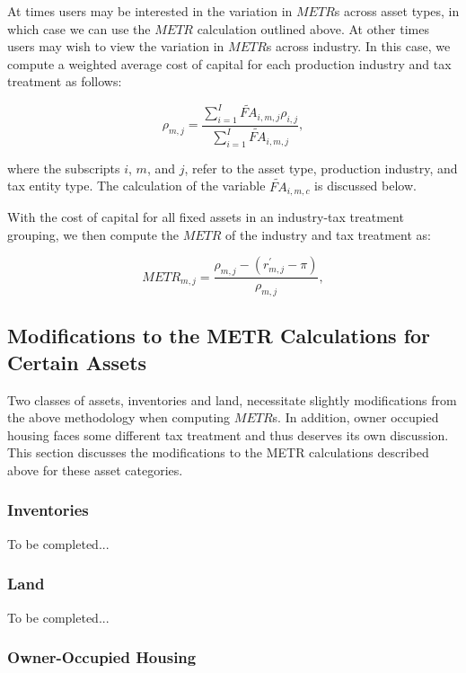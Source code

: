 \documentclass[article,11pt,letterpaper,fleqn]{article}
\theoremstyle{definition}
\numberwithin{equation}{section}
\begin{document}
At times users may be interested in the variation in $METR$s across asset types, in which case we can use the $METR$ calculation outlined above. At other times users may wish to view the variation in $METR$s across industry.  In this case, we compute a weighted average cost of capital for each production industry and tax treatment as follows:

\begin{equation}
\rho_{m,j} = \frac{\sum_{i=1}^{I}\widetilde{FA}_{i,m,j}\rho_{i,j}}{\sum_{i=1}^{I}\widetilde{FA}_{i,m,j}} ,
\end{equation}

\noindent\noindent where the subscripts $i$, $m$, and $j$, refer to the asset type, production industry, and tax entity type.  The calculation of the variable $\widetilde{FA}_{i,m,c}$ is discussed below.

With the cost of capital for all fixed assets in an industry-tax treatment grouping, we then compute the $METR$ of the industry and tax treatment as:

\begin{equation}
METR_{m,j} =  \frac{\rho_{m,j} - (r^{'}_{m,j}-\pi)}{\rho_{m,j}},
\end{equation}

\subsection{Modifications to the METR Calculations for Certain Assets}

Two classes of assets, inventories and land, necessitate slightly modifications from the above methodology when computing $METR$s.  In addition, owner occupied housing faces some different tax treatment and thus deserves its own discussion.  This section discusses the modifications to the METR calculations described above for these asset categories.

\subsubsection{Inventories}

To be completed...


\subsubsection{Land}

To be completed...


\subsubsection{Owner-Occupied Housing}
\end{document}
